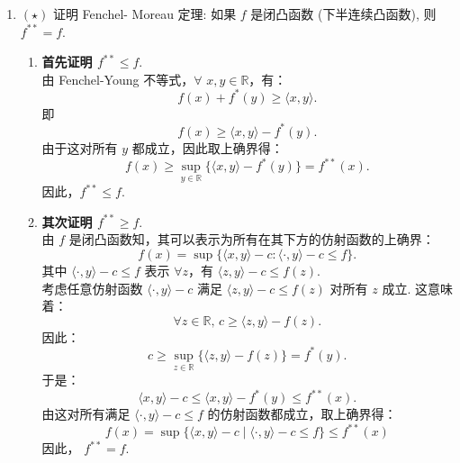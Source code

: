 \begin{enumerate}
    \item[3.]$(\star)$ 证明 Fenchel- Moreau 定理: 如果 \(f\) 是闭凸函数 (下半连续凸函数), 则 \(\displaystyle f^{**}=f\).
    \begin{solution}
        \begin{enumerate}
        \item[i.] \textbf{首先证明 \( f^{**} \leq f \)}.\\
        由 Fenchel-Young 不等式，$\forall$ \( x, y \in \mathbb{R} \)，有：
        \[
        f(x) + f^*(y) \geq \langle x, y \rangle.
        \]
        即
        \[
        f(x) \geq \langle x, y \rangle - f^*(y).
        \]
        由于这对所有 \( y \) 都成立，因此取上确界得：
        \[
        f(x) \geq \sup_{y\in\mathbb{R}} \{ \langle x, y \rangle - f^*(y) \} = f^{**}(x).
        \]
        因此，\( f^{**} \leq f \).
        
        \item[ii.] \textbf{其次证明 \( f^{**} \geq f \)}.\\
        由 \( f \) 是闭凸函数知，其可以表示为所有在其下方的仿射函数的上确界：
        \[
        f(x) = \sup \{ \langle x, y \rangle - c : \langle \cdot, y \rangle - c \leq f \}.
        \]
        其中 \( \langle \cdot, y \rangle - c \leq f \) 表示 $\forall  z $，有 \( \langle z, y \rangle - c \leq f(z) \).\\
        考虑任意仿射函数 \( \langle \cdot, y \rangle - c \) 满足 \( \langle z, y \rangle - c \leq f(z) \) 对所有 \( z \) 成立.
        这意味着：
        \[
        \forall z\in\mathbb{R},\,c \geq \langle z, y \rangle - f(z).
        \]
        因此：
        \[
        c \geq \sup_{z\in\mathbb{R}} \{ \langle z, y \rangle - f(z) \} = f^*(y).
        \]
        于是：
        \[
        \langle x, y \rangle - c \leq \langle x, y \rangle - f^*(y) \leq f^{**}(x).
        \]
        由这对所有满足 \( \langle \cdot, y \rangle - c \leq f \) 的仿射函数都成立，取上确界得：
        \[
        f(x) = \sup \{ \langle x, y \rangle - c \mid \langle \cdot, y \rangle - c \leq f \} \leq f^{**}(x)
        \]
        因此， \( f^{**} = f \).
        \end{enumerate}
    \end{solution}
    

\end{enumerate}
